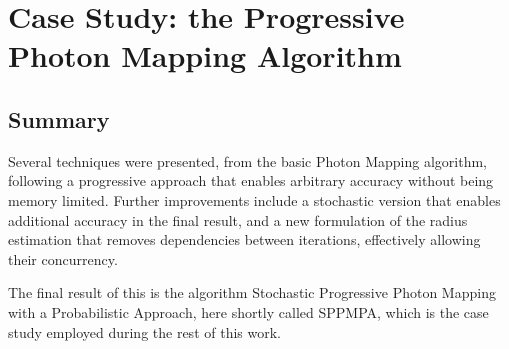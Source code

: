 \documentclass[main.tex]{subfiles}
\begin{document}
\chapter{Case Study: the Progressive Photon Mapping Algorithm} \label{chapter:case_study}







\section{Summary}

Several techniques were presented, from the basic Photon Mapping algorithm, following a progressive approach that enables arbitrary accuracy without being memory limited. Further improvements include a stochastic version that enables additional accuracy in the final result, and a new formulation of the radius estimation that removes dependencies between iterations, effectively allowing their concurrency.

The final result of this is the algorithm Stochastic Progressive Photon Mapping with a Probabilistic Approach, here shortly called SPPMPA, which is the case study employed during the rest of this work.
\end{document}
